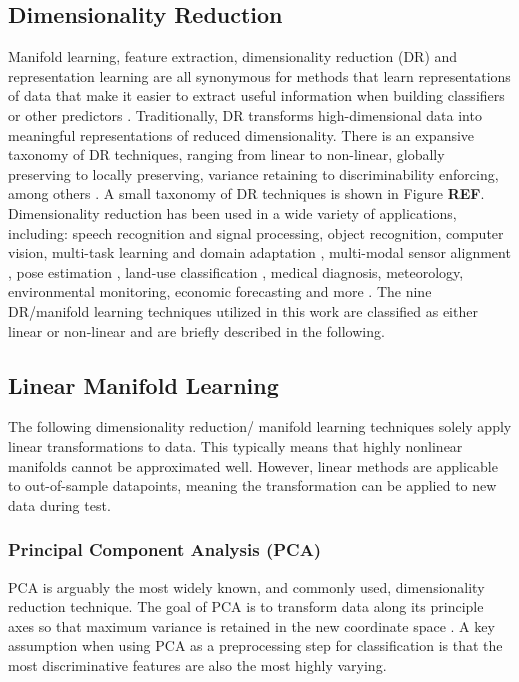 \documentclass[conference]{IEEEtran}
\begin{document}
	\subsection{Dimensionality Reduction}
	Manifold learning, feature extraction, dimensionality reduction (DR) and representation learning are all synonymous for methods that learn representations of data that make it easier to extract useful information when building classifiers or other predictors \cite{Bengio2014RepLearningReview}. Traditionally, DR transforms high-dimensional data into meaningful representations of reduced dimensionality.  There is an expansive taxonomy of DR techniques, ranging from linear to non-linear, globally preserving to locally preserving, variance retaining to discriminability enforcing, among others \cite{VanDerMaaten2009DRReview}.  A small taxonomy of DR techniques is shown in Figure \textbf{REF}.   Dimensionality reduction has been used in a wide variety  of applications, including: speech recognition and signal processing, object recognition, computer vision, multi-task learning and domain adaptation \cite{Bengio2014RepLearningReview}, multi-modal sensor alignment \cite{zhang2010multisourceremotingsensingfusion,Davenport2010JointManifoldsDataFusion}, pose estimation \cite{Navaratnam2007JointManifoldSemiSupRegression}, land-use classification \cite{Hong2019LearnableManifoldAlignment}, medical diagnosis, meteorology, environmental monitoring, economic forecasting and more \cite{Zitova2003SurveyImageRegistrationMethods}.  The nine DR/manifold learning techniques utilized in this work are classified as either linear or non-linear and are briefly described in the following.
	
	\subsection{Linear Manifold Learning}
	The following dimensionality reduction/ manifold learning techniques solely apply linear transformations to data.  This typically means that highly nonlinear manifolds cannot be approximated well.  However, linear methods are applicable to out-of-sample datapoints, meaning the transformation can be applied to new data during test.
	\subsubsection*{Principal Component Analysis (PCA)}  PCA is arguably the most widely known, and commonly used, dimensionality reduction technique.  The goal of PCA is to transform data along its principle axes so that maximum variance is retained in the new coordinate space \cite{Tipping1999PPCA,Murphy2012Textbook}.  A key assumption when using PCA as a preprocessing step for classification is that the most discriminative features are also the most highly varying.
\end{document}

